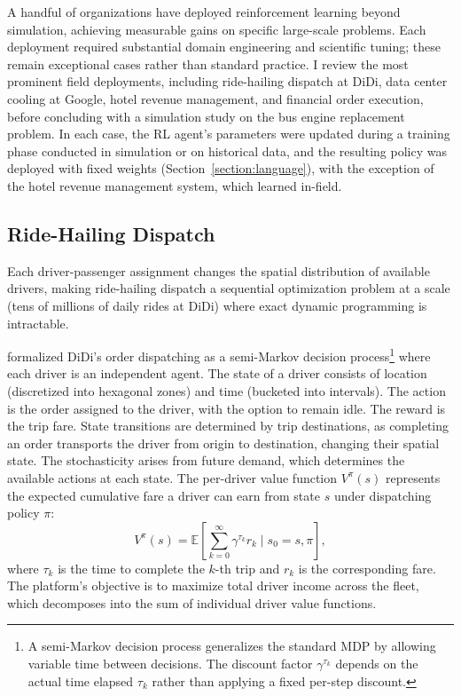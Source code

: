 
A handful of organizations have deployed reinforcement learning beyond simulation, achieving measurable gains on specific large-scale problems. Each deployment required substantial domain engineering and scientific tuning; these remain exceptional cases rather than standard practice. I review the most prominent field deployments, including ride-hailing dispatch at DiDi, data center cooling at Google, hotel revenue management, and financial order execution, before concluding with a simulation study on the bus engine replacement problem. In each case, the RL agent's parameters were updated during a training phase conducted in simulation or on historical data, and the resulting policy was deployed with fixed weights (Section~\ref{section:language}), with the exception of the hotel revenue management system, which learned in-field.

\subsection{Ride-Hailing Dispatch}
\label{sec:ridehailing}

Each driver-passenger assignment changes the spatial distribution of available drivers, making ride-hailing dispatch a sequential optimization problem at a scale (tens of millions of daily rides at DiDi) where exact dynamic programming is intractable.

\citet{Qin2021dispatch} formalized DiDi's order dispatching as a semi-Markov decision process\footnote{A semi-Markov decision process generalizes the standard MDP by allowing variable time between decisions. The discount factor $\gamma^{\tau_k}$ depends on the actual time elapsed $\tau_k$ rather than applying a fixed per-step discount.} where each driver is an independent agent. The state of a driver consists of location (discretized into hexagonal zones) and time (bucketed into intervals). The action is the order assigned to the driver, with the option to remain idle. The reward is the trip fare. State transitions are determined by trip destinations, as completing an order transports the driver from origin to destination, changing their spatial state. The stochasticity arises from future demand, which determines the available actions at each state. The per-driver value function $V^{\pi}(s)$ represents the expected cumulative fare a driver can earn from state $s$ under dispatching policy $\pi$:
\begin{equation}
V^{\pi}(s) = \mathbb{E}\left[ \sum_{k=0}^{\infty} \gamma^{\tau_k} r_k \mid s_0 = s, \pi \right],
\end{equation}
where $\tau_k$ is the time to complete the $k$-th trip and $r_k$ is the corresponding fare. The platform's objective is to maximize total driver income across the fleet, which decomposes into the sum of individual driver value functions.

